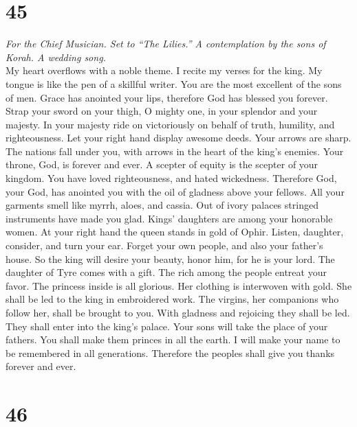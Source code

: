 \hypertarget{section-44}{%
\section{45}\label{section-44}}

\emph{For the Chief Musician. Set to ``The Lilies.'' A contemplation by
the sons of Korah. A wedding song.}\\
 My heart overflows with a noble theme. I recite my verses
for the king. My tongue is like the pen of a skillful writer.
 You are the most excellent of the sons of men. Grace has
anointed your lips, therefore God has blessed you forever.
 Strap your sword on your thigh, O mighty one, in your
splendor and your majesty.  In your majesty ride on
victoriously on behalf of truth, humility, and righteousness. Let your
right hand display awesome deeds.  Your arrows are sharp.
The nations fall under you, with arrows in the heart of the king's
enemies.  Your throne, God, is forever and ever. A scepter
of equity is the scepter of your kingdom.  You have loved
righteousness, and hated wickedness. Therefore God, your God, has
anointed you with the oil of gladness above your fellows. 
All your garments smell like myrrh, aloes, and cassia. Out of ivory
palaces stringed instruments have made you glad.  Kings'
daughters are among your honorable women. At your right hand the queen
stands in gold of Ophir.  Listen, daughter, consider, and
turn your ear. Forget your own people, and also your father's house.
 So the king will desire your beauty, honor him, for he
is your lord.  The daughter of Tyre comes with a gift.
The rich among the people entreat your favor.  The
princess inside is all glorious. Her clothing is interwoven with gold.
 She shall be led to the king in embroidered work. The
virgins, her companions who follow her, shall be brought to you.
 With gladness and rejoicing they shall be led. They
shall enter into the king's palace.  Your sons will take
the place of your fathers. You shall make them princes in all the earth.
 I will make your name to be remembered in all
generations. Therefore the peoples shall give you thanks forever and
ever.

\hypertarget{section-45}{%
\section{46}\label{section-45}}

